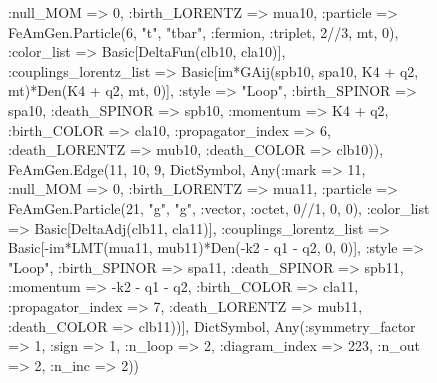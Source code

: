\documentclass{revtex4}
\begin{document}
\begin{figure}[!htb]
\begin{center}
{:null_MOM => 0, :birth_LORENTZ => mua10, :particle => FeAmGen.Particle(6, "t", "tbar", :fermion, :triplet, 2//3, mt, 0), :color_list => Basic[DeltaFun(clb10, cla10)], :couplings_lorentz_list => Basic[im*GAij(spb10, spa10, K4 + q2, mt)*Den(K4 + q2, mt, 0)], :style => "Loop", :birth_SPINOR => spa10, :death_SPINOR => spb10, :momentum => K4 + q2, :birth_COLOR => cla10, :propagator_index => 6, :death_LORENTZ => mub10, :death_COLOR => clb10)), FeAmGen.Edge(11, 10, 9, Dict{Symbol, Any}(:mark => 11, :null_MOM => 0, :birth_LORENTZ => mua11, :particle => FeAmGen.Particle(21, "g", "g", :vector, :octet, 0//1, 0, 0), :color_list => Basic[DeltaAdj(clb11, cla11)], :couplings_lorentz_list => Basic[-im*LMT(mua11, mub11)*Den(-k2 - q1 - q2, 0, 0)], :style => "Loop", :birth_SPINOR => spa11, :death_SPINOR => spb11, :momentum => -k2 - q1 - q2, :birth_COLOR => cla11, :propagator_index => 7, :death_LORENTZ => mub11, :death_COLOR => clb11))], Dict{Symbol, Any}(:symmetry_factor => 1, :sign => 1, :n_loop => 2, :diagram_index => 223, :n_out => 2, :n_inc => 2)) 
}
\end{center}
\end{figure}
\end{document}
